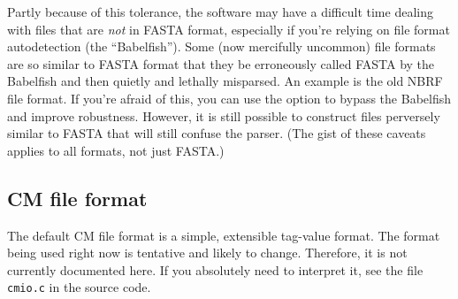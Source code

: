 Partly because of this tolerance, the software may have a difficult
time dealing with files that are \textit{not} in FASTA format,
especially if you're relying on file format autodetection (the
``Babelfish'').  Some (now mercifully uncommon) file formats are so
similar to FASTA format that they be erroneously called FASTA by the
Babelfish and then quietly and lethally misparsed. An example is the
old NBRF file format. If you're afraid of this, you can use the
 option to bypass the Babelfish and improve
robustness. However, it is still possible to construct files
perversely similar to FASTA that will still confuse the parser.  (The
gist of these caveats applies to all formats, not just FASTA.)

\subsection{CM file format}

The default CM file format is a simple, extensible tag-value format.
The format being used right now is tentative and likely to
change. Therefore, it is not currently documented here. If you
absolutely need to interpret it, see the file \verb+cmio.c+ in the
source code.


